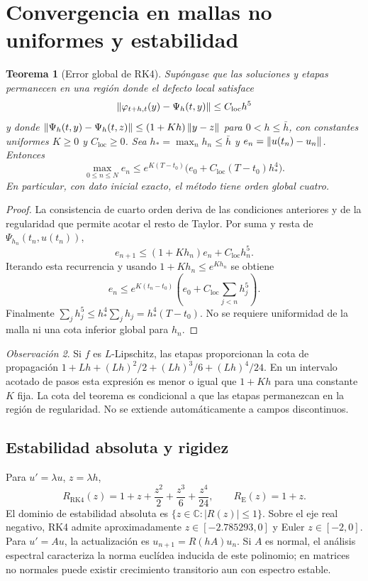 \documentclass[11pt,a4paper]{article}
\newtheorem{theorem}{Teorema}[section]
\theoremstyle{definition}\newtheorem{definition}[theorem]{Definición}
\theoremstyle{remark}\newtheorem{remark}[theorem]{Observación}
\begin{document}
\section{Convergencia en mallas no uniformes y estabilidad}
\begin{theorem}[Error global de RK4]\label{thm:global}
Supóngase que las soluciones y etapas permanecen en una región donde el
defecto local satisface
\[
 \left\lVert\varphi_{t+h,t}(y)-\Psi_h(t,y)\right\rVert\leq C_{\mathrm{loc}}h^5
\]
y donde $\left\lVert\Psi_h(t,y)-\Psi_h(t,z)\right\rVert\leq(1+Kh)\left\lVert y-z\right\rVert$
para $0<h\leq\bar h$, con constantes uniformes $K\geq0$ y
$C_{\mathrm{loc}}\geq0$. Sea
$h_* =\max_n h_n\leq\bar h$ y $e_n=\left\lVert u(t_n)-u_n\right\rVert$. Entonces
\begin{equation}\label{eq:global}
 \max_{0\leq n\leq N}e_n
 \leq e^{K(T-t_0)}\bigl(e_0+C_{\mathrm{loc}}(T-t_0)h_*^4\bigr).
\end{equation}
En particular, con dato inicial exacto, el método tiene orden global cuatro.
\end{theorem}
\begin{proof}
La consistencia de cuarto orden deriva de las condiciones anteriores y de
la regularidad que permite acotar el resto de Taylor. Por suma y resta de
$\Psi_{h_n}(t_n,u(t_n))$,
\[
 e_{n+1}\leq(1+Kh_n)e_n+C_{\mathrm{loc}}h_n^5.
\]
Iterando esta recurrencia y usando $1+Kh_n\leq e^{Kh_n}$ se obtiene
\[
e_n\leq e^{K(t_n-t_0)}
\left(e_0+C_{\mathrm{loc}}\sum_{j<n}h_j^5\right).
\]
Finalmente $\sum_j h_j^5\leq h_*^4\sum_j h_j=h_*^4(T-t_0)$.
No se requiere uniformidad de la malla ni una cota inferior global para $h_n$.
\end{proof}
\begin{remark}
Si $f$ es $L$-Lipschitz, las etapas proporcionan la cota de propagación
$1+Lh+(Lh)^2/2+(Lh)^3/6+(Lh)^4/24$. En un intervalo acotado de pasos esta
expresión es menor o igual que $1+Kh$ para una constante $K$ fija. La cota
del teorema es condicional a que las etapas permanezcan en la región de
regularidad. No se extiende automáticamente a campos discontinuos.
\end{remark}

\subsection{Estabilidad absoluta y rigidez}
Para $u'=\lambda u$, $z=\lambda h$,
\[
R_{\mathrm{RK4}}(z)=1+z+\frac{z^2}{2}+\frac{z^3}{6}+\frac{z^4}{24},
\qquad R_{\mathrm E}(z)=1+z.
\]
El dominio de estabilidad absoluta es $\{z\in\mathbb C:|R(z)|\leq1\}$.
Sobre el eje real negativo, RK4 admite aproximadamente
$z\in[-2.785293,0]$ y Euler $z\in[-2,0]$. Para
$u'=Au$, la actualización es $u_{n+1}=R(hA)u_n$. Si $A$ es normal, el
análisis espectral caracteriza la norma euclídea inducida de este polinomio; en matrices no
normales puede existir crecimiento transitorio aun con espectro estable.
\end{document}
